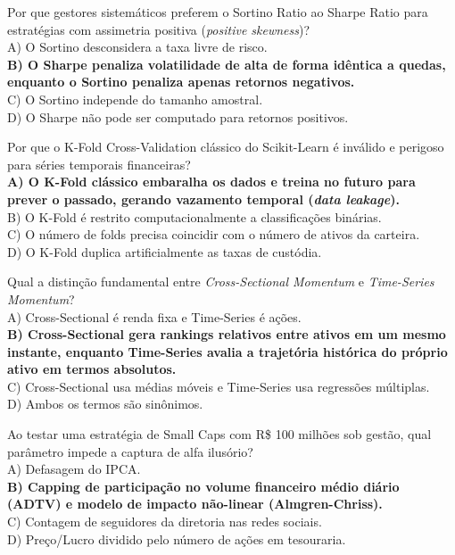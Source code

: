 \documentclass[11pt,a4paper]{article}
\begin{document}
\begin{infobox}
Por que gestores sistemáticos preferem o Sortino Ratio ao Sharpe Ratio para estratégias com assimetria positiva (\textit{positive skewness})?\\
A) O Sortino desconsidera a taxa livre de risco.\\
\textbf{B) O Sharpe penaliza volatilidade de alta de forma idêntica a quedas, enquanto o Sortino penaliza apenas retornos negativos.}\\
C) O Sortino independe do tamanho amostral.\\
D) O Sharpe não pode ser computado para retornos positivos.
\end{infobox}

\begin{infobox}
Por que o K-Fold Cross-Validation clássico do Scikit-Learn é inválido e perigoso para séries temporais financeiras?\\
\textbf{A) O K-Fold clássico embaralha os dados e treina no futuro para prever o passado, gerando vazamento temporal (\textit{data leakage}).}\\
B) O K-Fold é restrito computacionalmente a classificações binárias.\\
C) O número de folds precisa coincidir com o número de ativos da carteira.\\
D) O K-Fold duplica artificialmente as taxas de custódia.
\end{infobox}

\begin{infobox}
Qual a distinção fundamental entre \textit{Cross-Sectional Momentum} e \textit{Time-Series Momentum}?\\
A) Cross-Sectional é renda fixa e Time-Series é ações.\\
\textbf{B) Cross-Sectional gera rankings relativos entre ativos em um mesmo instante, enquanto Time-Series avalia a trajetória histórica do próprio ativo em termos absolutos.}\\
C) Cross-Sectional usa médias móveis e Time-Series usa regressões múltiplas.\\
D) Ambos os termos são sinônimos.
\end{infobox}

\begin{infobox}
Ao testar uma estratégia de Small Caps com R\$ 100 milhões sob gestão, qual parâmetro impede a captura de alfa ilusório?\\
A) Defasagem do IPCA.\\
\textbf{B) Capping de participação no volume financeiro médio diário (ADTV) e modelo de impacto não-linear (Almgren-Chriss).}\\
C) Contagem de seguidores da diretoria nas redes sociais.\\
D) Preço/Lucro dividido pelo número de ações em tesouraria.
\end{infobox}
\end{document}
